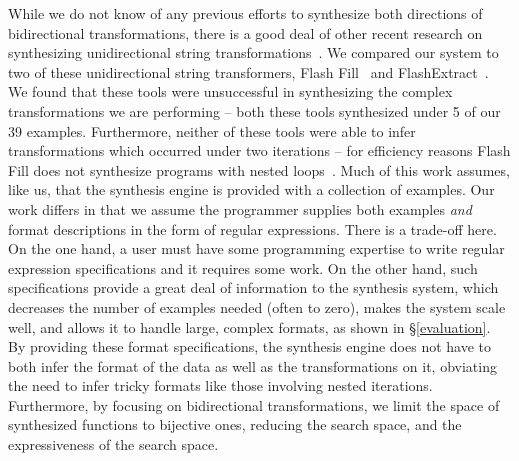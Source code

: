 \documentclass[acmsmall,screen]{acmart}
\begin{document}
While we do not know of any previous efforts to synthesize both directions of
bidirectional transformations, there is a good deal of other recent research on
synthesizing unidirectional string
transformations~\cite{singh2012learning,le-pldi-2014,gulwani-popl-2014,perelman2014test,Singh:blinkfill}.
We compared our system to two of these unidirectional string transformers,
Flash Fill~\cite{gulwani-popl-2014} and FlashExtract~\cite{le-pldi-2014}.
We found that these tools were unsuccessful in synthesizing the complex
transformations we are performing -- both these tools synthesized under 5 of our
39 examples.  Furthermore, neither of these tools were able to infer
transformations 
which occurred under two iterations -- for efficiency reasons Flash Fill
does not synthesize programs with nested loops~\cite{gulwani-popl-2014}.
Much of this work assumes, like us, that the synthesis engine is provided with a
collection of 
examples.  Our work differs in that we assume the programmer supplies
both examples {\em and} format descriptions in the form of regular expressions.
There is a trade-off here.  On the one hand, a user must have some 
programming expertise to
write regular expression specifications
and it requires some work.
On the other hand, such specifications provide a great deal of information
to the synthesis system, which decreases the number of examples needed
(often to zero), makes the system scale well, and
allows it to handle large, complex formats, as shown
in \S \ref{evaluation}.  By providing these format specifications, the synthesis
engine does not have to both infer the format of the data as well as the
transformations on it, obviating the need to infer tricky formats like those
involving nested iterations.
Furthermore, by focusing on bidirectional transformations, we limit the
space of synthesized functions to bijective ones, reducing the search space, and
the expressiveness of the search space.
\end{document}
